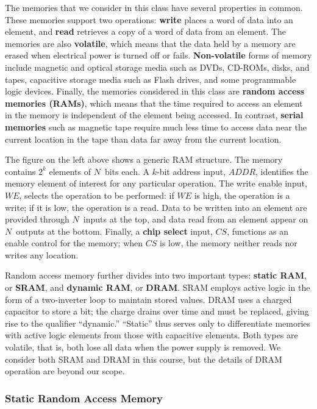 \centerline{}
%
The memories that we consider in this class have several properties in
common.  These memories support two operations: {\bf write} places a
word of data into an element, and {\bf read} retrieves a copy of a
word of data from an element.  The memories are also {\bf volatile},
which means that the data held by a memory are erased when electrical
power is turned off or fails.  {\bf Non-volatile} forms of memory
include magnetic and optical storage media such as DVDs, CD-ROMs, disks, 
and tapes, capacitive storage media such as Flash drives,
and some programmable logic devices.
Finally, the memories considered in this class are {\bf random access
memories (RAMs)}, which means that the time required to access an
element in the memory is independent of the element being accessed.
In contrast, {\bf serial memories} such as magnetic tape require much
less time to access data near the current location in the tape than
data far away from the current location.

The figure on the left above shows a generic RAM structure.  The
memory contains $2^k$ elements of $N$~bits each.  A \mbox{$k$-bit}
address input, $ADDR$, identifies the memory element of interest for
any particular operation.  The write enable
input,~$WE$, selects the operation to be performed: if
$WE$ is high, the operation is a write; if it is low, the
operation is a read.  Data to be written into an element are provided
through $N$~inputs at the top, and data read from an element appear on
$N$~outputs at the bottom.  Finally, a {\bf chip select} input, $CS$,
functions as an enable control for the memory; when $CS$ is low, the
memory neither reads nor writes any location.

Random access memory further divides into two important types: {\bf
static RAM}, or {\bf SRAM}, and {\bf dynamic RAM}, or {\bf DRAM}.
SRAM employs active logic in the form of a two-inverter loop to
maintain stored values.  DRAM uses a charged capacitor to store a bit;
the charge drains over time and must be replaced, giving rise to the
qualifier ``dynamic.''  ``Static'' thus serves only to differentiate
memories with active logic elements from those with capacitive
elements.  Both types are volatile, that is, both lose all data when the
power supply is removed.  We consider both SRAM and DRAM 
in this course, but the details of DRAM operation are beyond our scope. \\


\subsubsection{Static Random Access Memory}

